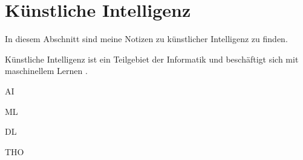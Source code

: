\section{Künstliche Intelligenz}
\label{sec:ai}

In diesem Abschnitt sind meine Notizen zu künstlicher Intelligenz zu finden.

Künstliche Intelligenz ist ein Teilgebiet der Informatik und beschäftigt sich mit maschinellem Lernen \citep{ai-wikipedia}.

AI\citep{ai-ibm}

ML\citep{machine-learning-ibm}

DL\citep{deep-learning-ibm}

THO\citep{Ai-is-running-out-of-water}